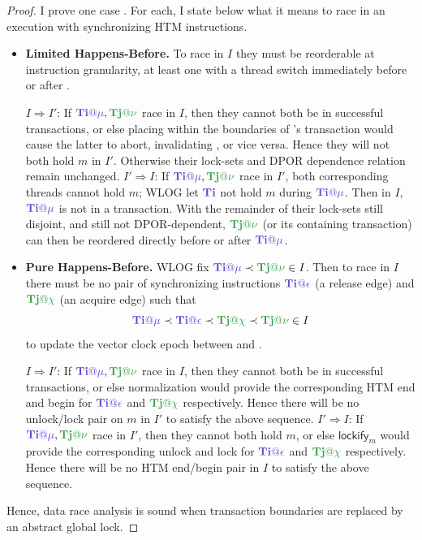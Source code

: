 \begin{proof}
I prove one case .
For each, I state below what it means to race in an execution with synchronizing HTM instructions.

\begin{itemize}
	\item {\bf Limited Happens-Before.}
		To race in $I$ they must be reorderable at instruction granularity,
		at least one with a thread switch immediately before or after
		\cite{tsan,hybriddatarace}.
		\begin{itemize}
			\llitem $I \Rightarrow I'$:
				If $\tiiat{\mu},\tjjat{\nu}$ race in $I$,
				then they cannot both be in successful transactions,
				or else placing \tiiat{\mu} within the boundaries of \tjjat{\nu}'s transaction
				would cause the latter to abort, invalidating \tjjat{\nu}, or vice versa.
				Hence they will not both hold $m$ in $I'$.
				Otherwise their lock-sets and DPOR dependence relation remain unchanged.
			\llitem $I' \Rightarrow I$:
				If $\tiiat{\mu},\tjjat{\nu}$ race in $I'$,
				both corresponding threads cannot hold $m$;
				WLOG let $\tii$ not hold $m$ during $\tiiat{\mu}$.
				Then in $I$, $\tiiat{\mu}$ is not in a transaction.
				With the remainder of their lock-sets still disjoint,
				and still not DPOR-dependent, $\tjjat{\nu}$ (or its containing transaction)
				can then be reordered directly before or after $\tiiat{\mu}$.
		\end{itemize}
	\item {\bf Pure Happens-Before.}
		WLOG fix $\tiiat{\mu} \prec \tjjat{\nu} \in I$.
		Then to race in $I$ there must be no pair of synchronizing instructions
		$\tiiat{\epsilon}$ (a release edge) and $\tjjat{\chi}$ (an acquire edge) such that
		\[
			\tiiat{\mu} \prec \tiiat{\epsilon} \prec \tjjat{\chi} \prec \tjjat{\nu} \in I
		\]
		to update the vector clock epoch between \tiiat{\mu} and \tjjat{\nu} \cite{djit,fasttrack}.
		\begin{itemize}
			\llitem $I \Rightarrow I'$:
				If $\tiiat{\mu},\tjjat{\nu}$ race in $I$,
				then they cannot both be in successful transactions,
				or else  normalization would provide
				the corresponding HTM end and begin for $\tiiat{\epsilon}$ and $\tjjat{\chi}$ respectively.
				Hence there will be no unlock/lock pair on $m$ in $I'$ to satisfy the above sequence.
			\llitem $I' \Rightarrow I$:
				If $\tiiat{\mu},\tjjat{\nu}$ race in $I'$,
				then they cannot both hold $m$,
				or else $\mathsf{lockify}_m$ would provide the corresponding
				unlock and lock for $\tiiat{\epsilon}$ and $\tjjat{\chi}$ respectively.
				Hence there will be no HTM end/begin pair in $I$ to satisfy the above sequence.
		\end{itemize}
\end{itemize}
Hence, data race analysis is sound when transaction boundaries are replaced by an abstract global lock.
\end{proof}

